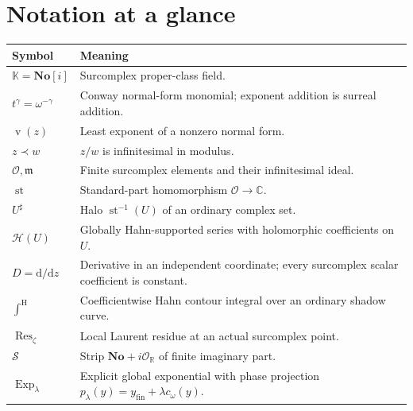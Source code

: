 \documentclass[11pt,letterpaper]{article}
\numberwithin{equation}{section}
\theoremstyle{definition}
\theoremstyle{remark}
\newcommand{\No}{\mathbf{No}}
\newcommand{\K}{\mathbb{K}}
\newcommand{\C}{\mathbb{C}}
\newcommand{\R}{\mathbb{R}}
\newcommand{\OO}{\mathcal{O}}
\newcommand{\mm}{\mathfrak{m}}
\newcommand{\HH}{\mathcal{H}}
\newcommand{\st}{\operatorname{st}}
\newcommand{\Res}{\operatorname{Res}}
\newcommand{\fin}{\operatorname{fin}}
\newcommand{\val}{\operatorname{v}}
\newcommand{\Exp}{\operatorname{Exp}}
\newcommand{\cint}{\mathop{\int}\nolimits^{\mathrm H}}
\begin{document}
\section{Notation at a glance}
\begin{longtable}{@{}p{}p{}@{}}
\toprule
\textbf{Symbol} & \textbf{Meaning}\\
\midrule
\endhead
$\K=\No[i]$ & Surcomplex proper-class field.\\[3pt]
$t^\gamma=\omega^{-\gamma}$ & Conway normal-form monomial; exponent addition
is surreal addition.\\[3pt]
$\val(z)$ & Least exponent of a nonzero normal form.\\[3pt]
$z\prec w$ & $z/w$ is infinitesimal in modulus.\\[3pt]
$\OO,\mm$ & Finite surcomplex elements and their infinitesimal ideal.\\[3pt]
$\st$ & Standard-part homomorphism $\OO\to\C$.\\[3pt]
$U^\sharp$ & Halo $\st^{-1}(U)$ of an ordinary complex set.\\[3pt]
$\HH(U)$ & Globally Hahn-supported series with holomorphic coefficients on $U$.\\[3pt]
$D=\mathrm d/\mathrm dz$ & Derivative in an independent coordinate; every
surcomplex scalar coefficient is constant.\\[3pt]
$\cint$ & Coefficientwise Hahn contour integral over an ordinary shadow curve.\\[3pt]
$\Res_\zeta$ & Local Laurent residue at an actual surcomplex point.\\[3pt]
$\mathcal S$ & Strip $\No+i\OO_\R$ of finite imaginary part.\\[3pt]
$\Exp_\lambda$ & Explicit global exponential with phase projection
$p_\lambda(y)=y_{\fin}+\lambda c_\omega(y)$.\\
\bottomrule
\end{longtable}
\end{document}
